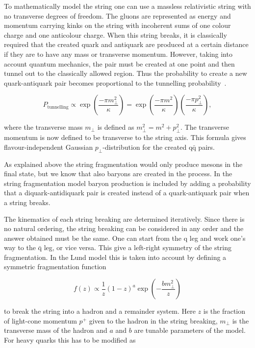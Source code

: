 To mathematically model the string one can use a massless relativistic string with no transverse degrees of freedom. The gluons are represented as energy and momentum carrying kinks on the string with incoherent sums of one colour charge and one anticolour charge. When this string breaks, it is classically required that the created quark and antiquark are produced at a certain distance if they are to have any mass or transverse momentum. However, taking into account quantum mechanics, the pair must be created at one point and then tunnel out to the classically allowed region. Thus the probability to create a new quark-antiquark pair becomes proportional to the tunnelling probability~\cite{ANDERSSON198331}.


\begin{equation}
P_\mathrm{tunnelling} \propto \exp \left(\frac{-\pi m_\perp^2}{\kappa} \right) = \exp \left(\frac{-\pi m^2}{\kappa} \right) \left(\frac{-\pi p_\perp^2}{\kappa} \right),
\end{equation}

\noindent where the transverse mass $m_\perp$ is defined as $m_\perp^2 = m^2 + p_\perp ^2$. The transverse momentum is now defined to be transverse to the string axis. This formula gives flavour-independent Gaussian $p_\perp$-distribution for the created $\mathrm{q \bar q}$ pairs.

As explained above the string fragmentation would only produce mesons in the final state, but we know that also baryons are created in the process. In the string fragmentation model baryon production is included by adding a probability that a diquark-antidiquark pair is created instead of a quark-antiquark pair when a string breaks.

The kinematics of each string breaking are determined iteratively. Since there is no natural ordering, the string breaking can be considered in any order and the answer obtained must be the same. One can start from the q leg and work one's way to the $\bar{\mathrm{q}}$ leg, or vice versa. This give a left-right symmetry of the string fragmentation. In the Lund model this is taken into account by defining a symmetric fragmentation function

\begin{equation}
f\left(z\right) \propto \frac{1}{z} \left(1-z\right)^a \exp \left(-\frac{b m_\perp ^2}{z} \right)
\label{eq:symmetric}
\end{equation}

\noindent to break the string into a hadron and a remainder system. Here $z$ is the fraction of light-cone momentum $p^+$ given to the hadron in the string breaking, $m_\perp$ is the transverse mass of the hadron and $a$ and $b$ are tunable parameters of the model. For heavy quarks this has to be modified as 

